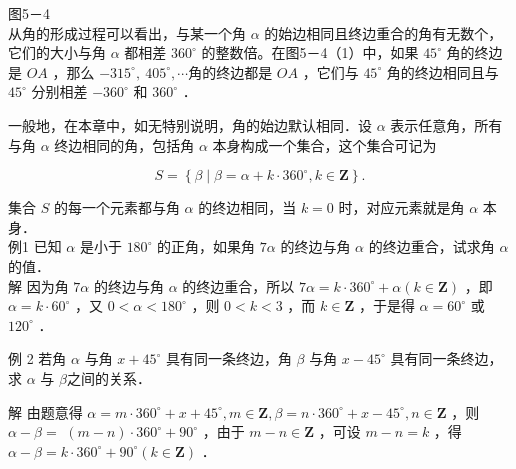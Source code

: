 \documentclass[10pt]{article}
\begin{document}
图5－4\\
从角的形成过程可以看出，与某一个角 \(\alpha\) 的始边相同且终边重合的角有无数个，它们的大小与角 \(\alpha\) 都相差 \(360^{\circ}\) 的整数倍。在图5－4（1）中，如果 \(45^{\circ}\) 角的终边是 \(O A\) ，那么 \(-315^{\circ}, ~ 405^{\circ}, \cdots\)角的终边都是 \(O A\) ，它们与 \(45^{\circ}\) 角的终边相同且与 \(45^{\circ}\) 分别相差 \(-360^{\circ}\) 和 \(360^{\circ}\) ．

一般地，在本章中，如无特别说明，角的始边默认相同．设 \(\alpha\) 表示任意角，所有与角 \(\alpha\) 终边相同的角，包括角 \(\alpha\) 本身构成一个集合，这个集合可记为

\[
S=\left\{\beta \mid \beta=\alpha+k \cdot 360^{\circ}, k \in \mathbf{Z}\right\} .
\]

集合 \(S\) 的每一个元素都与角 \(\alpha\) 的终边相同，当 \(k=0\) 时，对应元素就是角 \(\alpha\) 本身．\\
例1 已知 \(\alpha\) 是小于 \(180^{\circ}\) 的正角，如果角 \(7 \alpha\) 的终边与角 \(\alpha\) 的终边重合，试求角 \(\alpha\) 的值．\\
解 因为角 \(7 \alpha\) 的终边与角 \(\alpha\) 的终边重合，所以 \(7 \alpha=k \cdot 360^{\circ}+\alpha(k \in \mathbf{Z})\) ，即 \(\alpha=k \cdot 60^{\circ}\) ，又 \(0<\alpha<180^{\circ}\) ，则 \(0<k<3\) ，而 \(k \in \mathbf{Z}\) ，于是得 \(\alpha=60^{\circ}\) 或 \(120^{\circ}\) ．

例 2 若角 \(\alpha\) 与角 \(x+45^{\circ}\) 具有同一条终边，角 \(\beta\) 与角 \(x-45^{\circ}\) 具有同一条终边，求 \(\alpha\) 与 \(\beta\)之间的关系．

解 由题意得 \(\alpha=m \cdot 360^{\circ}+x+45^{\circ}, m \in \mathbf{Z}, \beta=n \cdot 360^{\circ}+x-45^{\circ}, n \in \mathbf{Z}\) ，则 \(\alpha-\beta=\) \((m-n) \cdot 360^{\circ}+90^{\circ}\) ，由于 \(m-n \in \mathbf{Z}\) ，可设 \(m-n=k\) ，得 \(\alpha-\beta=k \cdot 360^{\circ}+90^{\circ}(k \in \mathbf{Z})\) ．
\end{document}
